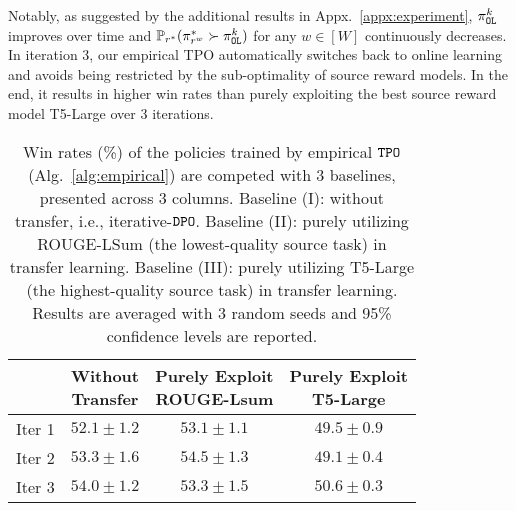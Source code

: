 Notably, as suggested by the additional results in Appx.~\ref{appx:experiment}, $\pi^k_{\texttt{OL}}$ improves over time and ${\mathbb{P}}_{r^*}(\pi^*_{r^w} \succ \pi^k_{\texttt{OL}})$ for any $w\in[W]$ continuously decreases.
In iteration 3, our empirical TPO automatically switches back to online learning and avoids being restricted by the sub-optimality of source reward models. In the end, it results in higher win rates than purely exploiting the best source reward model T5-Large over 3 iterations.
\begin{table}[t]
    \centering
    \begin{tabular}{cccc}
        \hline
                & \makecell{Without \\ Transfer} & \makecell{Purely Exploit \\ ROUGE-Lsum} & \makecell{Purely Exploit \\ T5-Large} \\
                \hline
         Iter 1 &  $52.1\pm1.2$ & $53.1\pm1.1$ & $49.5\pm0.9$\\
         Iter 2 &  $53.3\pm1.6$ & $54.5\pm1.3$ & $49.1\pm0.4$\\
         Iter 3 &  $54.0\pm1.2$ & $53.3\pm1.5$ & $50.6\pm0.3$\\\hline
    \end{tabular}
    \caption{Win rates (\%) of the policies trained by empirical ${\texttt{TPO}}$ (Alg.~\ref{alg:empirical}) are competed with 3 baselines, presented across 3 columns. {Baseline (I)}: without transfer, i.e., iterative-${\texttt{DPO}}$. {Baseline (II)}:  purely utilizing ROUGE-LSum (the lowest-quality source task) in transfer learning. {Baseline (III)}: purely utilizing T5-Large (the highest-quality source task) in transfer learning. Results are averaged with 3 random seeds and 95\% confidence levels are reported.
    }
    \label{tab:experiment}
\end{table}